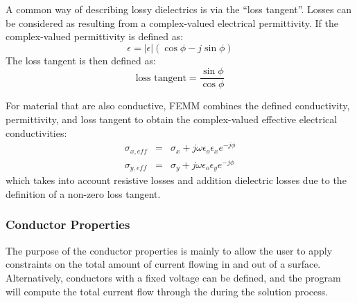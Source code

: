 %
%

A common way of describing lossy dielectrics is via the ``loss tangent''.
Losses can be considered as resulting from a complex-valued electrical permittivity.
If the complex-valued permittivity is defined as:
\begin{equation}
\epsilon = \left| \epsilon \right| \left( \cos \phi - j \sin \phi \right)
\end{equation}
The loss tangent is then defined as:
\begin{equation} \mbox{loss tangent} = \frac{\sin \phi}{\cos \phi} \end{equation}

For material that are also conductive, FEMM combines the defined conductivity, permittivity,
and loss tangent to obtain the complex-valued effective electrical conductivities:
\begin{eqnarray}
\sigma_{x,eff} & = & \sigma_x + j \omega \epsilon_o \epsilon_x e^{-j \phi} \\ \nonumber
\sigma_{y,eff} & = & \sigma_y + j \omega \epsilon_o \epsilon_y e^{-j \phi}
\end{eqnarray}
which takes into account resistive losses and addition dielectric losses due to the
definition of a non-zero loss tangent.

\subsubsection{Conductor Properties}

The purpose of the conductor properties is mainly to allow the user to apply
constraints on the total amount of current flowing in and out of a surface.
Alternatively, conductors with a fixed voltage can be defined, and the
program will compute the total current flow through the during the
solution process.

